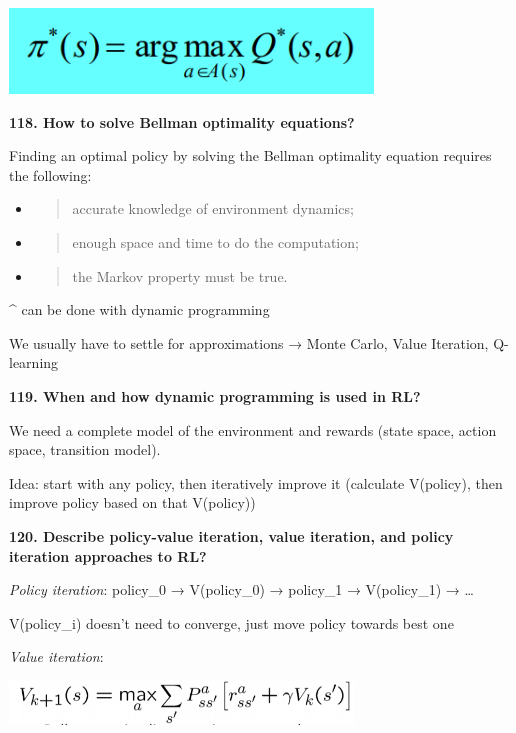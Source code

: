 \includegraphics[width=3.79843in,height=0.89604in]{media/image28.png}

\textbf{118. How to solve Bellman optimality equations?}

Finding an optimal policy by solving the Bellman optimality equation
requires the following:

\begin{itemize}
\item
  \begin{quote}
  accurate knowledge of environment dynamics;
  \end{quote}
\item
  \begin{quote}
  enough space and time to do the computation;
  \end{quote}
\item
  \begin{quote}
  the Markov property must be true.
  \end{quote}
\end{itemize}

\^{} can be done with dynamic programming

We usually have to settle for approximations → Monte Carlo, Value
Iteration, Q-learning

\textbf{119. When and how dynamic programming is used in RL?}

We need a complete model of the environment and rewards (state space,
action space, transition model).

Idea: start with any policy, then iteratively improve it (calculate
V(policy), then improve policy based on that V(policy))

\textbf{120. Describe policy-value iteration, value iteration, and
policy iteration approaches to RL?}

\textit{Policy iteration}: policy\_0 → V(policy\_0) → policy\_1 →
V(policy\_1) → \ldots{}

V(policy\_i) doesn't need to converge, just move policy towards best one

\textit{Value iteration}:

\includegraphics[width=3.60938in,height=0.46166in]{media/image34.png}

